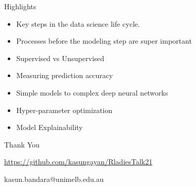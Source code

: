 \documentclass[12pt,ignorenonframetext,]{beamer}
\providecommand{\tightlist}{%
  \setlength{\itemsep}{0pt}\setlength{\parskip}{0pt}}
\begin{document}
\begin{frame}{Highlights}
\protect\hypertarget{highlights}{}

\begin{itemize}
\tightlist
\item
  Key steps in the data science life cycle. \vspace{2mm}
\item
  Processes before the modeling step are super important \vspace{2mm}
\item
  Supervised vs Unsupervised \vspace{2mm}
\item
  Measuring prediction accuracy \vspace{2mm}
\item
  Simple models to complex deep neural networks \vspace{2mm}
\item
  Hyper-parameter optimization \vspace{2mm}
\item
  Model Explainability
\end{itemize}

\end{frame}

\begin{frame}{}
\protect\hypertarget{section}{}

\Huge
\center

Thank You

\normalsize

\url{https://github.com/kasungayan/RladiesTalk21}

kasun.bandara@unimelb.edu.au

\end{frame}
\end{document}
